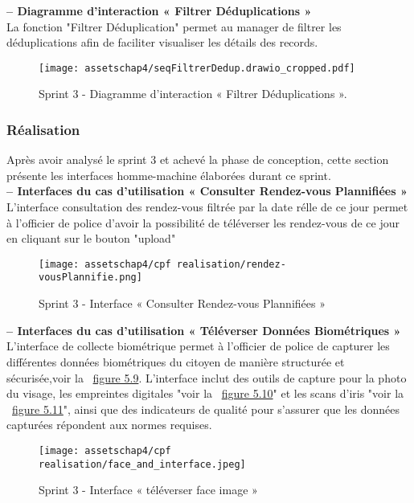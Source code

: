 \textbf{– Diagramme d'interaction « Filtrer Déduplications »}\\
La fonction "Filtrer Déduplication" permet au manager de filtrer les déduplications afin de faciliter visualiser les détails des records.
\begin{figure}[H]
\centering
\texttt{[image: assetschap4/seqFiltrerDedup.drawio\_cropped.pdf]}
\caption{ Sprint 3 - Diagramme d'interaction « Filtrer Déduplications ». }
\end{figure}




\subsubsection{Réalisation}
Après avoir analysé le sprint 3 et achevé la phase de conception, cette section présente les
interfaces homme-machine élaborées durant ce sprint.\\










\textbf{– Interfaces du cas d'utilisation « Consulter Rendez-vous Plannifiées »}\\
L'interface consultation des rendez-vous filtrée par la date rélle de ce jour permet à l'officier de police d'avoir la possibilité de téléverser les rendez-vous de ce jour en cliquant sur le bouton "upload"
\begin{figure}[H]
\centering
\texttt{[image: assetschap4/cpf realisation/rendez-vousPlannifie.png]}
\caption{ Sprint 3 - Interface « Consulter Rendez-vous Plannifiées » }
\label{fig:5.9}
\end{figure}





\textbf{– Interfaces du cas d'utilisation « Téléverser Données Biométriques »}\\
L'interface de collecte biométrique permet à l'officier de police de capturer les différentes données biométriques du citoyen de manière structurée et sécurisée,voir la ~\hyperref[fig:5.9]{figure 5.9}.
L'interface inclut des outils de capture pour la photo du visage, les empreintes digitales "voir la ~\hyperref[fig:5.10]{figure 5.10}" et les scans d'iris "voir la ~\hyperref[fig:5.11]{figure 5.11}", ainsi que des indicateurs de qualité pour s'assurer que les données capturées répondent aux normes requises.
\begin{figure}[H]
\centering
\texttt{[image: assetschap4/cpf realisation/face\_and\_interface.jpeg]}
\caption{ Sprint 3 - Interface « téléverser face image » }
\label{fig:5.9}
\end{figure}



